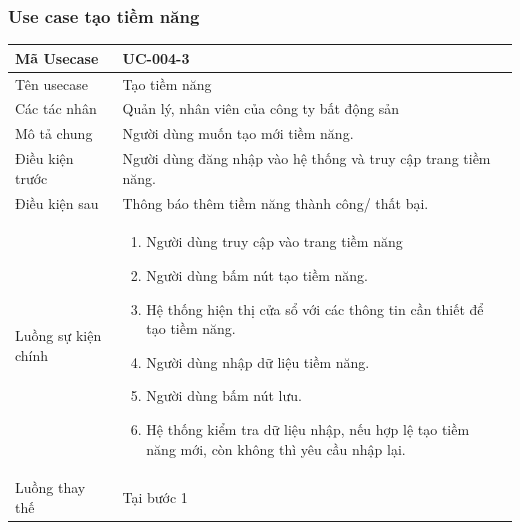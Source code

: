 \documentclass[12pt,a4paper]{article}
\begin{document}
    \subsubsection*{Use case tạo tiềm năng}
    \begin{table}[H]
        \centering
        \begin{tabular}{|p{3.5cm}|p{11.5cm}|c|}
            \hline
            Mã Usecase      & UC-004-3                                                       \\
            \hline
            Tên usecase     & Tạo tiềm năng                                                  \\
            \hline
            Các tác nhân    & Quản lý, nhân viên của công ty bất động sản                    \\
            \hline
            Mô tả chung     & Người dùng muốn tạo mới tiềm năng.                             \\
            \hline
            Điều kiện trước & Người dùng đăng nhập vào hệ thống và truy cập trang tiềm năng. \\
            \hline
            Điều kiện sau   & Thông báo thêm tiềm năng thành công/ thất bại.                 \\
            \hline
            Luồng sự kiện chính & \vspace{-.8cm}\begin{enumerate}
                                                    \item Người dùng truy cập vào trang tiềm năng
                                                    \item  Người dùng bấm nút tạo tiềm năng.
                                                    \item  Hệ thống hiện thị cửa sổ với các thông tin cần thiết để tạo tiềm năng.
                                                    \item  Người dùng nhập dữ liệu tiềm năng.
                                                    \item Người dùng bấm nút lưu.
                                                    \item Hệ thống kiểm tra dữ liệu nhập, nếu hợp lệ tạo tiềm năng mới, còn không thì yêu cầu nhập lại.
            \end{enumerate}
            \\
            \hline
            Luồng thay thế & Tại bước 1\newline

\end{tabular}
\end{table}
\end{document}
